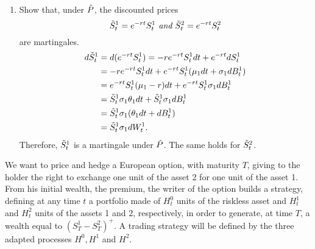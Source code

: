 \documentclass[handout,8pt]{beamer}
\begin{document}
\begin{frame}[allowframebreaks]{ }
\begin{enumerate}
\begin{enumerate}
        \item Show that, under $\Tilde{P}$, the discounted prices
        \begin{equation*}
            \Tilde{S}_t^1=e^{-rt}S_t^1 \textit{ and } \Tilde{S}_t^2 = e^{-rt} S_t^2
        \end{equation*}
        are martingales.\\
        \begin{align*}
            d\Tilde{S}_t^1 &= d(e^{-rt}S_t^1) = -re^{-rt}S_t^1 dt + e^{-rt} dS_t^1\\
            &= -re^{-rt}S_t^1 dt + e^{-rt}S_t^1(\mu_1 dt + \sigma_1 dB_t^1)\\
            &= e^{-rt}S_t^1(\mu_1 - r) dt + e^{-rt}S_t^1\sigma_1 dB_t^1\\
            &= \Tilde{S}_t^1\sigma_1\theta_1 dt + \Tilde{S}_t^1\sigma_1 dB_t^1\\
            &= \Tilde{S}_t^1\sigma_1(\theta_1 dt + dB_t^1)\\
            &= \Tilde{S}_t^1\sigma_1 dW_t^1.
        \end{align*}
        Therefore, $\Tilde{S}_t^1$ is a martingale under $\Tilde{P}$. The same holds for $\Tilde{S}_t^2$.
    \end{enumerate}
    
    We want to price and hedge a European option, with maturity $T$, giving to the holder the right to exchange one unit of the asset 2 for one unit of the asset 1. From his initial wealth, the premium, the writer of the option builds a strategy, defining at any time $t$ a portfolio made of $H_t^0$ units of the riskless asset and $H_t^1$ and $H_t^2$ units of the assets 1 and 2, respectively, in order to generate, at time $T$, a wealth equal to $(S_T^1-S_T^2)^+$. A trading strategy will be defined by the three adapted processes $H^0, H^1$ and $H^2$.
    \begin{enumerate}
        \setcounter{enumii}{3}
        

\end{enumerate}
\end{enumerate}
\end{frame}
\end{document}
